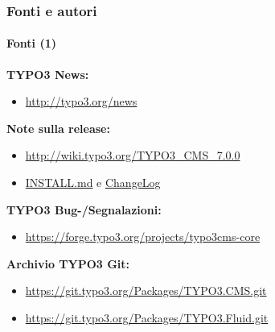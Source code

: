 \begin{frame}[fragile]
	\frametitle{Fonti e autori}
	\framesubtitle{Fonti (1)}

	\textbf{TYPO3 News:}
		\begin{itemize}\smaller
			\item \url{http://typo3.org/news}
		\end{itemize}

	\textbf{Note sulla release:}
		\begin{itemize}\smaller
			\item \url{http://wiki.typo3.org/TYPO3_CMS_7.0.0}
			\item \href{https://github.com/TYPO3/TYPO3.CMS/blob/master/INSTALL.md}{INSTALL.md} e \href{https://github.com/TYPO3/TYPO3.CMS/blob/master/ChangeLog}{ChangeLog}
		\end{itemize}

	\textbf{TYPO3 Bug-/Segnalazioni:}
		\begin{itemize}\smaller
			\item \url{https://forge.typo3.org/projects/typo3cms-core}
		\end{itemize}

	\textbf{Archivio TYPO3 Git:}
		\begin{itemize}\smaller
			\item \url{https://git.typo3.org/Packages/TYPO3.CMS.git}
			\item \url{https://git.typo3.org/Packages/TYPO3.Fluid.git}
		\end{itemize}

\end{frame}


